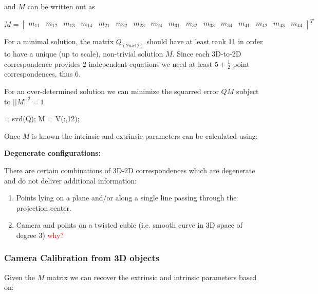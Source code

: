 \documentclass[10pt,a4paper]{scrartcl}
\begin{document}
\begin{multicols*}{2}
and $M$ can be written out as

\begin{tiny}
\begin{equation*}
M=\begin{bmatrix}
m_{11}&m_{12}&m_{13}&m_{14}&
m_{21}&m_{22}&m_{23}&m_{24}&
m_{31}&m_{32}&m_{33}&m_{34}&
m_{41}&m_{42}&m_{43}&m_{44}
\end{bmatrix}^T
\end{equation*}
\end{tiny}

For a minimal solution, the matrix $Q_{(2nx12)}$ should have at least rank 11 in order to have a unique (up to scale), non-trivial solution $M$. Since each 3D-to-2D correspondence provides 2 independent equations we need at least $5+\frac{1}{2}$ point correspondences, thus $6$.

For an over-determined solution we can minimize the squarred error $QM$ subject to $||M||^2=1$.

\begin{TPMatlab}
[U,S,V] = svd(Q); 
M = V(:,12);
\end{TPMatlab} 

Once $M$ is known the intrinsic and extrinsic parameters can be calculated using:


\textbf{Degenerate configurations:}

There are certain combinations of 3D-2D correspondences which are degenerate and do not deliver additional information:

\begin{enumerate}
\item Points lying on a plane and/or along a single line passing through the projection center.
\item Camera and points on a twisted cubic (i.e. smooth curve in 3D space of degree 3) \textcolor{red}{why?}
\end{enumerate}

\subsubsection{Camera Calibration from 3D objects}

Given the $M$ matrix we can recover the extrinsic and intrinsic parameters based on:



\end{multicols*}
\end{document}
